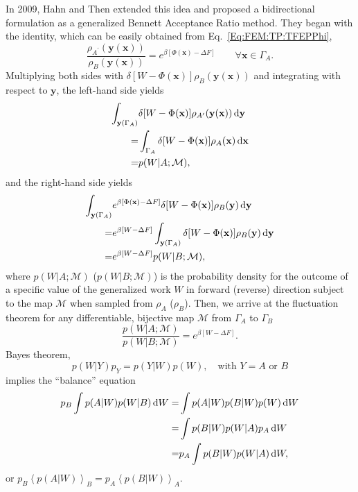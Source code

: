 In 2009, Hahn and Then extended this idea and proposed a bidirectional formulation as a generalized Bennett Acceptance Ratio method\cite{HahnPRE2009}.
They began with the identity, which can be easily obtained from Eq.~\ref{Eq:FEM:TP:TFEPPhi},
\begin{equation}
	\frac{\rho_{A^\prime}(\mathbf{y}(\mathbf{x}))}{\rho_B(\mathbf{y}(\mathbf{x}))}=e^{\beta\left[\Phi(\mathbf{x})-\Delta F\right]}\qquad \forall \mathbf{x}\in \Gamma_A.
\end{equation}
Multiplying both sides with $\delta [W-\Phi(\mathbf{x})]\rho_B(\mathbf{y}(\mathbf{x}))$ and integrating with respect to $\mathbf{y}$, the left-hand side yields
\begin{align}
	\int_{\mathbf{y}(\Gamma_A)}&\delta[W-\Phi(\mathbf{x})]\rho_{A^\prime}(\mathbf{y}(\mathbf{x}))\mathop{}\!\mathrm{d} \mathbf{y}\notag\\
	=&\int_{\Gamma_A}\delta[W-\Phi(\mathbf{x})]\rho_A(\mathbf{x})\mathop{}\!\mathrm{d} \mathbf{x}\notag\\
	=&p(W|A;\mathcal{M}),
\end{align}
and the right-hand side yields
\begin{align}
	\int_{\mathbf{y}(\Gamma_A)}&e^{\beta\left[\Phi(\mathbf{x})-\Delta F\right]}\delta[W-\Phi(\mathbf{x})]\rho_B(\mathbf{y})\mathop{}\!\mathrm{d} \mathbf{y}\notag\\
	=&e^{\beta\left[W-\Delta F\right]}\int_{\mathbf{y}(\Gamma_A)}\delta[W-\Phi(\mathbf{x})]\rho_B(\mathbf{y})\mathop{}\!\mathrm{d} \mathbf{y}\notag\\
	=&e^{\beta\left[W-\Delta F\right]}p(W|B;\mathcal{M}),
\end{align}
where $p(W|A;\mathcal{M})$ ($p(W|B;\mathcal{M})$) is the probability density for the outcome of a specific value of the generalized work $W$ in forward (reverse) direction subject to the map $\mathcal{M}$ when sampled from $\rho_A$ ($\rho_B$). Then, we arrive at the fluctuation theorem for any differentiable, bijective map $\mathcal{M}$ from $\Gamma_A$ to $\Gamma_B$
\begin{equation}
	\frac{p(W|A;\mathcal{M})}{p(W|B;\mathcal{M})}=e^{\beta\left[W-\Delta F\right]}.
	\label{Eq:FEM:TP:FluctTheo}
\end{equation}
Bayes theorem,
\begin{equation}
	p(W|Y)p_Y=p(Y|W)p(W), \quad \text{with $Y=A$ or $B$}
	\label{Eq:FEM:TP:Bayes}
\end{equation}
implies the ``balance'' equation
\begin{align}
	p_B\int p(A|W)p(W|B)\mathop{}\!\mathrm{d} W=&\int p(A|W)p(B|W)p(W)\mathop{}\!\mathrm{d} W\notag\\
	=&\int p(B|W)p(W|A)p_A\mathop{}\!\mathrm{d} W\notag\\
	=&p_A\int p(B|W)p(W|A)\mathop{}\!\mathrm{d} W,
	\label{Eq:FEM:TP:BalEq}
\end{align}
or $p_B\left<p(A|W)\right>_B=p_A\left<p(B|W)\right>_A$.

